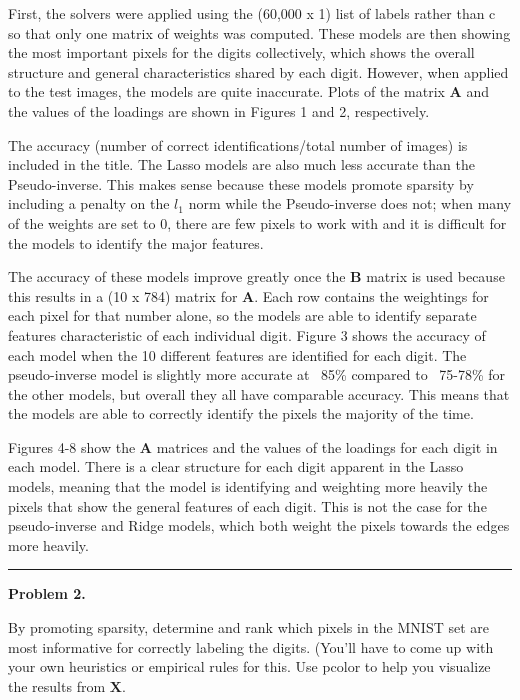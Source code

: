 \documentclass[10pt]{article}
\begin{document}
First, the solvers were applied using the (60,000 x 1) list of labels rather than c so that only one matrix of weights was computed. These models are then showing the most important pixels for the digits collectively, which shows the overall structure and general characteristics shared by each digit. However, when applied to the test images, the models are quite inaccurate. Plots of the matrix $\textbf{A}$ and the values of the loadings are shown in Figures 1 and 2, respectively. %

The accuracy (number of correct identifications/total number of images) is included in the title. The Lasso models are also much less accurate than the Pseudo-inverse. This makes sense because these models promote sparsity by including a penalty on the $l_1$ norm while the Pseudo-inverse does not; when many of the weights are set to 0, there are few pixels to work with and it is difficult for the models to identify the major features.

The accuracy of these models improve greatly once the  $\textbf{B}$ matrix is used because this results in a (10 x 784) matrix for  $\textbf{A}$. Each row contains the weightings for each pixel for that number alone, so the models are able to identify separate features characteristic of each individual digit. Figure 3 shows the accuracy of each model when the 10 different features are identified for each digit. The pseudo-inverse model is slightly more accurate at ~85\% compared to ~75-78\% for the other models, but overall they all have comparable accuracy. This means that the models are able to correctly identify the pixels the majority of the time. %

Figures 4-8 show the $\textbf{A}$ matrices and the values of the loadings for each digit in each model. There is a clear structure for each digit apparent in the Lasso models, meaning that the model is identifying and weighting more heavily the pixels that show the general features of each digit. This is not the case for the pseudo-inverse and Ridge models, which both weight the pixels towards the edges more heavily. %


\vskip 1cm
\hrule
{\bf Problem 2.}

By promoting sparsity, determine and rank which pixels in the MNIST set are most informative for correctly labeling the digits. (You’ll have to come up with your own heuristics or empirical rules for this. Use pcolor to help you visualize the results from $\textbf{X}$.
\end{document}
